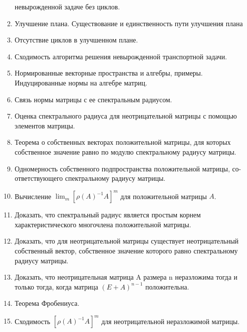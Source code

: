 \begin{enumerate}
	невырожденной задаче без циклов.
	\item Улучшение плана. Существование и единственность пути улучшения плана
	\item Отсутствие циклов в улучшенном плане.
	\item Сходимость алгоритма решения невырожденной транспортной задачи.
	\item Нормированные векторные пространства и алгебры, примеры. Индуцированные нормы на алгебре матриц.
	\item Связь нормы матрицы с ее спектральным радиусом.
	\item Оценка спектрального радиуса для неотрицательной матрицы с помощью
	элементов матрицы.
	\item Теорема о собственных векторах положительной матрицы, для которых
	собственное значение равно по модулю спектральному радиусу матрицы.
	\item Одномерность собственного подпространства положительной матрицы, со-
	ответствующего спектральному радиусу матрицы.
	\item Вычисление $\lim_m[{\rho(A)}^{−1}A]^m$ для положительной матрицы $A$.
	\item Доказать, что спектральный радиус является простым корнем характеристического многочлена положительной матрицы.
	\item Доказать, что для неотрицательной матрицы существует неотрицательный собственный вектор, собственное значение которого равно спектральному радиусу матрицы.
	\item Доказать, что неотрицательная матрица A размера n неразложима тогда
	и только тогда, когда матрица $(E + A)^{n−1}$ положительна.
	\item Теорема Фробениуса.
	\item Сходимость $[{\rho(A)}^{−1}A]^m$ для неотрицательной неразложимой матрицы.
\end{enumerate}


 